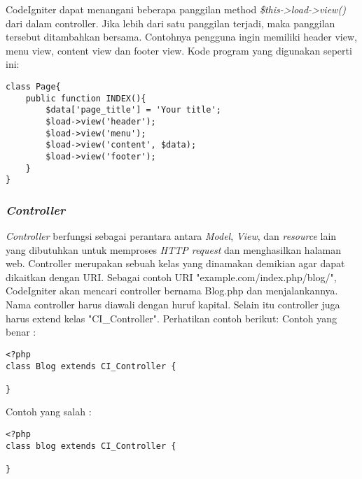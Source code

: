 	CodeIgniter dapat menangani beberapa panggilan method \textit{\$this->load->view()} dari dalam controller. Jika lebih dari satu panggilan terjadi, maka panggilan tersebut ditambahkan bersama. Contohnya pengguna ingin memiliki header view, menu view, content view dan footer view. Kode program yang digunakan seperti ini:
	\begin{lstlisting}[backgroundcolor = \color{lightgray}]
class Page{
	public function INDEX(){
		$data['page_title'] = 'Your title';
		$load->view('header');
		$load->view('menu');
		$load->view('content', $data);
		$load->view('footer');
	}
}
	\end{lstlisting}
	
	\subsubsection{\textit{Controller}}
	\textit{Controller} berfungsi sebagai perantara antara \textit{Model}, \textit{View}, dan \textit{resource} lain yang dibutuhkan untuk memproses \textit{HTTP request} dan menghasilkan halaman web. Controller merupakan sebuah kelas yang dinamakan demikian agar dapat dikaitkan dengan URI. Sebagai contoh URI "example.com/index.php/blog/", CodeIgniter akan mencari controller bernama Blog.php dan menjalankannya. Nama controller harus diawali dengan huruf kapital. Selain itu controller juga harus extend kelas "CI\_Controller".
	Perhatikan contoh berikut:
	Contoh yang benar :
\begin{lstlisting}[backgroundcolor = \color{lightgray}]
<?php
class Blog extends CI_Controller {

}
\end{lstlisting}
	
	Contoh yang salah :
\begin{lstlisting}[backgroundcolor = \color{lightgray}]
<?php
class blog extends CI_Controller {

}
\end{lstlisting} 

